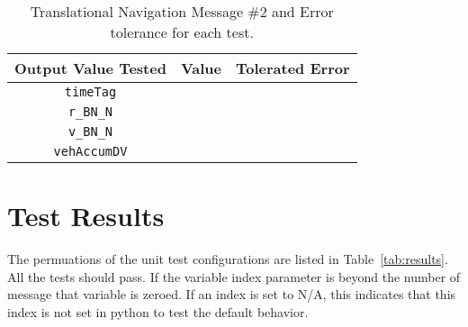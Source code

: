 \begin{table}[htbp]
	\caption{Translational Navigation Message \#2 and Error tolerance for each test.}
	\label{tab:transNav2}
	\centering \fontsize{10}{10}\selectfont
	\begin{tabular}{ c | c | c } %
		\hline\hline
		\textbf{Output Value Tested} & \textbf{Value} & \textbf{Tolerated Error}  \\ 
		\hline
		{\tt timeTag}  &       & 	   \\ 
		{\tt r\_BN\_N}  &       & 	   \\ 
		{\tt v\_BN\_N}  &       & 	   \\ 
		{\tt vehAccumDV}  &       & 	   \\ 
		\hline\hline
	\end{tabular}
\end{table}



\section{Test Results}
The permuations of the unit test configurations are listed in Table~\ref{tab:results}.  All the tests should pass.  If the variable index parameter is beyond the number of message that variable is zeroed.  If an index is set to N/A, this indicates that this index is not set in python to test the default behavior.



